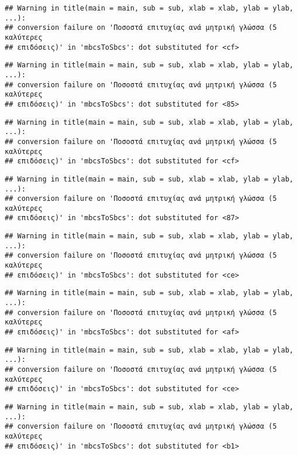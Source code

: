 \documentclass[
]{article}
\begin{document}
\begin{verbatim}
## Warning in title(main = main, sub = sub, xlab = xlab, ylab = ylab, ...):
## conversion failure on 'Ποσοστά επιτυχίας ανά μητρική γλώσσα (5 καλύτερες
## επιδόσεις)' in 'mbcsToSbcs': dot substituted for <cf>
\end{verbatim}

\begin{verbatim}
## Warning in title(main = main, sub = sub, xlab = xlab, ylab = ylab, ...):
## conversion failure on 'Ποσοστά επιτυχίας ανά μητρική γλώσσα (5 καλύτερες
## επιδόσεις)' in 'mbcsToSbcs': dot substituted for <85>
\end{verbatim}

\begin{verbatim}
## Warning in title(main = main, sub = sub, xlab = xlab, ylab = ylab, ...):
## conversion failure on 'Ποσοστά επιτυχίας ανά μητρική γλώσσα (5 καλύτερες
## επιδόσεις)' in 'mbcsToSbcs': dot substituted for <cf>
\end{verbatim}

\begin{verbatim}
## Warning in title(main = main, sub = sub, xlab = xlab, ylab = ylab, ...):
## conversion failure on 'Ποσοστά επιτυχίας ανά μητρική γλώσσα (5 καλύτερες
## επιδόσεις)' in 'mbcsToSbcs': dot substituted for <87>
\end{verbatim}

\begin{verbatim}
## Warning in title(main = main, sub = sub, xlab = xlab, ylab = ylab, ...):
## conversion failure on 'Ποσοστά επιτυχίας ανά μητρική γλώσσα (5 καλύτερες
## επιδόσεις)' in 'mbcsToSbcs': dot substituted for <ce>
\end{verbatim}

\begin{verbatim}
## Warning in title(main = main, sub = sub, xlab = xlab, ylab = ylab, ...):
## conversion failure on 'Ποσοστά επιτυχίας ανά μητρική γλώσσα (5 καλύτερες
## επιδόσεις)' in 'mbcsToSbcs': dot substituted for <af>
\end{verbatim}

\begin{verbatim}
## Warning in title(main = main, sub = sub, xlab = xlab, ylab = ylab, ...):
## conversion failure on 'Ποσοστά επιτυχίας ανά μητρική γλώσσα (5 καλύτερες
## επιδόσεις)' in 'mbcsToSbcs': dot substituted for <ce>
\end{verbatim}

\begin{verbatim}
## Warning in title(main = main, sub = sub, xlab = xlab, ylab = ylab, ...):
## conversion failure on 'Ποσοστά επιτυχίας ανά μητρική γλώσσα (5 καλύτερες
## επιδόσεις)' in 'mbcsToSbcs': dot substituted for <b1>
\end{verbatim}
\end{document}
